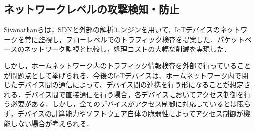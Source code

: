 \documentclass[Japanese]{dicomopapers}
\begin{document}
\subsection{ネットワークレベルの攻撃検知・防止}
Sivanathanらは，SDNと外部の解析エンジンを用いて，IoTデバイスのネットワークを常に監視し，フローレベルでのトラフィック検査を提案した\cite{lowcost}．パケットベースのネットワーク監視と比較し，処理コストの大幅な削減を実現した．\par
しかし，ホームネットワーク内のトラフィック情報検査を外部で行っていることが問題点として挙げられる．今後のIoTデバイスは、ホームネットワーク内で閉じたデバイス間の通信によって、デバイス間の連携を行う形になることが想定される\cite{d2d}．デバイス間で直接通信を行う場合，各デバイスにおいてアクセス制御を行う必要がある．しかし，全てのデバイスがアクセス制御に対応しているとは限らず，デバイスの計算能力やソフトウェア自体の脆弱性によってアクセス制御が機能しない場合が考えられる\cite{disap}．

\end{document}
